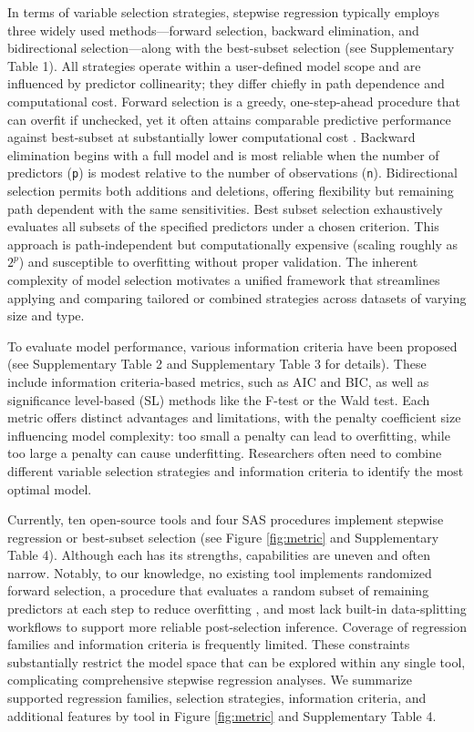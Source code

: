 In terms of variable selection strategies, stepwise regression typically employs three widely used methods---forward selection, backward elimination, and bidirectional selection---along with the best-subset selection (see Supplementary Table 1). All strategies operate within a user-defined model scope and are influenced by predictor collinearity; they differ chiefly in path dependence and computational cost. Forward selection is a greedy, one-step-ahead procedure that can overfit if unchecked, yet it often attains comparable predictive performance against best-subset at substantially lower computational cost \citep{HastieTibshirani2020}. Backward elimination begins with a full model and is most reliable when the number of predictors (\texttt{p}) is modest relative to the number of observations (\texttt{n}). Bidirectional selection permits both additions and deletions, offering flexibility but remaining path dependent with the same sensitivities. Best subset selection exhaustively evaluates all subsets of the specified predictors under a chosen criterion. This approach is path-independent but computationally expensive (scaling roughly as \(2^p\)) and susceptible to overfitting without proper validation. The inherent complexity of model selection motivates a unified framework that streamlines applying and comparing tailored or combined strategies across datasets of varying size and type.

To evaluate model performance, various information criteria have been proposed (see Supplementary Table 2 and Supplementary Table 3 for details). These include information criteria-based metrics, such as AIC and BIC, as well as significance level-based (SL) methods like the F-test or the Wald test. Each metric offers distinct advantages and limitations, with the penalty coefficient size influencing model complexity: too small a penalty can lead to overfitting, while too large a penalty can cause underfitting. Researchers often need to combine different variable selection strategies and information criteria to identify the most optimal model.

Currently, ten open-source tools and four SAS procedures implement stepwise regression or best-subset selection (see Figure \ref{fig:metric} and Supplementary Table 4). Although each has its strengths, capabilities are uneven and often narrow. Notably, to our knowledge, no existing tool implements randomized forward selection, a procedure that evaluates a random subset of remaining predictors at each step to reduce overfitting \citep{Mentch2020, Chen2025}, and most lack built-in data-splitting workflows to support more reliable post-selection inference. Coverage of regression families and information criteria is frequently limited. These constraints substantially restrict the model space that can be explored within any single tool, complicating comprehensive stepwise regression analyses. We summarize supported regression families, selection strategies, information criteria, and additional features by tool in Figure \ref{fig:metric} and Supplementary Table 4.

